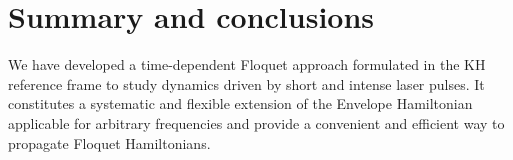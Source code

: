 \documentclass[
pra%
,preprint%
,amssymb, nobibnotes, aps, superscriptaddress, floatfix]{revtex4}
\begin{document}
%
%
%
%
%
%

\pagebreak
\section{Summary and conclusions}

We have developed a time-dependent Floquet approach formulated in the KH reference frame to study dynamics driven by short and intense laser pulses. It constitutes a systematic and flexible extension of the Envelope Hamiltonian \cite{Toyota} applicable for arbitrary frequencies and provide a convenient and efficient way to propagate Floquet Hamiltonians. 
\end{document}
